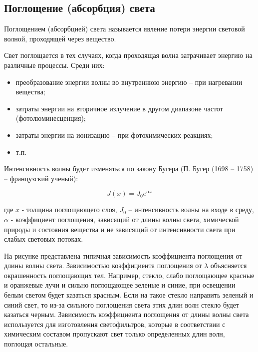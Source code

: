 \documentclass[12pt,a4paper,draft]{article}
\begin{document}
    \subsection{Поглощение (абсорбция) света}
    Поглощением (абсорбцией) света называется явление потери энергии световой волной, проходящей через вещество.

    Свет поглощается в тех случаях, когда проходящая волна затрачивает энергию на различные процессы. Среди них:
    \begin{itemize}
        \item преобразование энергии волны во внутреннюю энергию – при нагревании вещества;
        \item затраты энергии на вторичное излучение в другом диапазоне частот (фотолюминесценция);
        \item затраты энергии на ионизацию – при фотохимических реакциях;
        \item т.п.
    \end{itemize}

    Интенсивность волны будет изменяться по закону Бугера (П. Бугер (1698 – 1758) – французский ученый):

    \begin{equation}
        J(x) = J_0e^{\alpha x}
    \end{equation}

    где $x$ - толщина поглощающего слоя, $J_0$ – интенсивность волны на входе в среду, $\alpha$ - коэффициент поглощения, зависящий от длины волны света, химической природы и состояния вещества и не зависящий от интенсивности света при слабых световых потоках.

    На рисунке представлена типичная зависимость коэффициента поглощения от длины волны света. Зависимостью коэффициента поглощения от $\lambda$ объясняется окрашенность поглощающих тел. Например, стекло, слабо поглощающее красные и оранжевые лучи и сильно поглощающее зеленые и синие, при освещении белым светом будет казаться красным. Если на такое стекло направить зеленый и синий свет, то из-за сильного поглощения света этих длин волн стекло будет казаться черным. Зависимость коэффициента поглощения от длины волны света используется для изготовления светофильтров, которые в соответствии с химическим составом пропускают свет только определенных длин волн, поглощая остальные.
    
\end{document}
